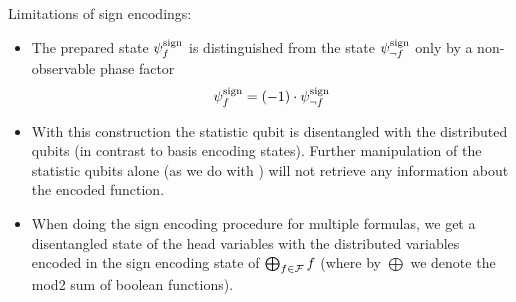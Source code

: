 Limitations of sign encodings:
\begin{itemize}
    \item The prepared state $\psi^{\mathrm{sign}}_{f}$ is distinguished from the state $\psi^{\mathrm{sign}}_{\lnot f}$ only by a non-observable phase factor
    \begin{align*}
        \psi^{\mathrm{sign}}_{f}
        = (-1) \cdot \psi^{\mathrm{sign}}_{\lnot f}
    \end{align*}
    \item With this construction the statistic qubit is disentangled with the distributed qubits (in contrast to basis encoding states).
    Further manipulation of the statistic qubits alone (as we do with \activationCircuits{}) will not retrieve any information about the encoded function.
    \item When doing the sign encoding procedure for multiple formulas, we get a disentangled state of the head variables with the distributed variables encoded in the sign encoding state of $\bigoplus_{f\in\mathcal{F}}f$ (where by $\bigoplus$ we denote the mod2 sum of boolean functions).
\end{itemize}